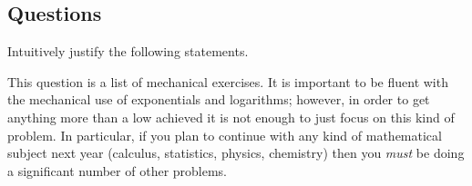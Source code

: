 \subsection*{Questions}
\begin{questions}
  \question Intuitively justify the following statements.
  \question This question is a list of mechanical exercises. It is important to be fluent
            with the mechanical use of exponentials and logarithms; however, in order to
            get anything more than a low achieved it is not enough to just focus on this
            kind of problem. In particular, if you plan to continue with any kind of mathematical
            subject next year (calculus, statistics, physics, chemistry) then you \emph{must} be
            doing a significant number of other problems.
\end{questions}
